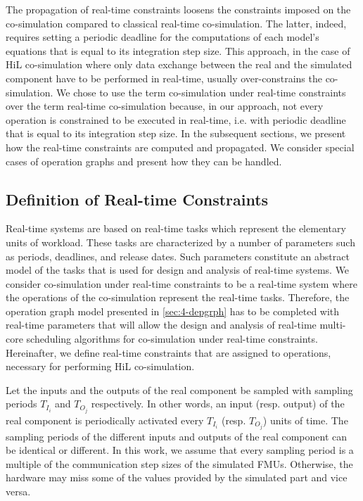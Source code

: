 The propagation of real-time constraints loosens the constraints imposed on the co-simulation compared to classical real-time co-simulation. The latter, indeed, requires setting a periodic deadline for the computations of each model's equations that is equal to its integration step size. This approach, in the case of HiL co-simulation where only data exchange between the real and the simulated component have to be performed in real-time, usually over-constrains the co-simulation. We chose to use the term co-simulation under real-time constraints over the term real-time co-simulation because, in our approach, not every operation is constrained to be executed in real-time, i.e. with periodic deadline that is equal to its integration step size. In the subsequent sections, we present how the real-time constraints are computed and propagated. We consider special cases of operation graphs and present how they can be handled.

\subsection{Definition of Real-time Constraints}

Real-time systems are based on real-time tasks which represent the elementary units of workload. These tasks are characterized by a number of parameters such as periods, deadlines, and release dates. Such parameters constitute an abstract model of the tasks that is used for design and analysis of real-time systems. We consider co-simulation under real-time constraints to be a real-time system where the operations of the co-simulation represent the real-time tasks. Therefore, the operation graph model presented in \ref{sec:4-depgrph} has to be completed with real-time parameters that will allow the design and analysis of real-time multi-core scheduling algorithms for co-simulation under real-time constraints. Hereinafter, we define real-time constraints that are assigned to operations, necessary for performing HiL co-simulation.

Let the inputs and the outputs of the real component be sampled with sampling periods $T_{I_i}$ and $T_{O_j}$ respectively. In other words, an input (resp. output) of the real component is periodically activated every $T_{I_i}$ (resp. $T_{O_j}$) units of time. The sampling periods of the different inputs and outputs of the real component can be identical or different. In this work, we assume that every sampling period is a multiple of the communication step sizes of the simulated FMUs. Otherwise, the hardware may miss some of the values provided by the simulated part and vice versa. 

